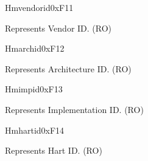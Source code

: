 
\begin{register}{H}{mvendorid}{0xF11}\label{regdesc:MVENDORID}
%
\regnewline%
\begin{regdesc}\begin{reglist}
\label{fielddesc:MVENDORID}\item [MVENDORID] Represents Vendor ID. (RO)
\end{reglist}\end{regdesc}
\end{register}

\begin{register}{H}{marchid}{0xF12}\label{regdesc:MARCHID}
%
\regnewline%
\begin{regdesc}\begin{reglist}
\label{fielddesc:MARCHID}\item [MARCHID] Represents Architecture ID. (RO)
\end{reglist}\end{regdesc}
\end{register}

\begin{register}{H}{mimpid}{0xF13}\label{regdesc:MIMPID}
%
\regnewline%
\begin{regdesc}\begin{reglist}
\label{fielddesc:MIMPID}\item [MIMPID] Represents Implementation ID. (RO)
\end{reglist}\end{regdesc}
\end{register}

\begin{register}{H}{mhartid}{0xF14}\label{regdesc:MHARTID}
%
\regnewline%
\begin{regdesc}\begin{reglist}
\label{fielddesc:MHARTID}\item [MHARTID] Represents Hart ID. (RO)
\end{reglist}\end{regdesc}
\end{register}

